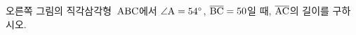 \noindent\begin{minipage}[t]{0.58\linewidth}\vspace{0pt}\raggedright 오른쪽 그림의 직각삼각형~$\mathrm{ABC}$에서 $\angle\mathrm{A}=54^\circ$, $\overline{\mathrm{BC}}=50$일 때, $\overline{\mathrm{AC}}$의 길이를 구하시오.\end{minipage}\hfill\begin{minipage}[t]{0.4\linewidth}\vspace{0pt}\centering \resizebox{\ifdim\width>\linewidth\linewidth\else\width\fi}{!}{}\end{minipage}\par
